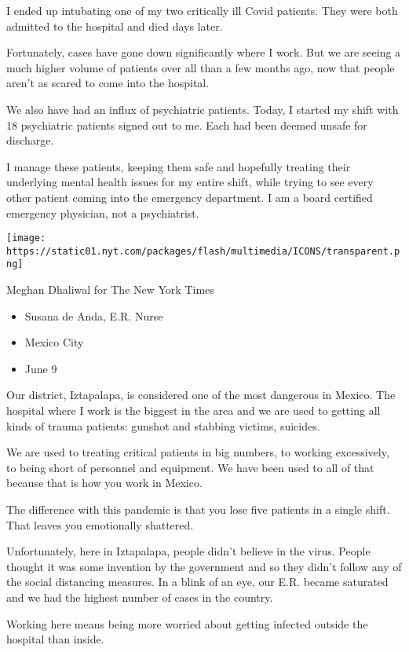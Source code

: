 I ended up intubating one of my two critically ill Covid patients. They
were both admitted to the hospital and died days later.

Fortunately, cases have gone down significantly where I work. But we are
seeing a much higher volume of patients over all than a few months ago,
now that people aren't as scared to come into the hospital.

We also have had an influx of psychiatric patients. Today, I started my
shift with 18 psychiatric patients signed out to me. Each had been
deemed unsafe for discharge.

I manage these patients, keeping them safe and hopefully treating their
underlying mental health issues for my entire shift, while trying to see
every other patient coming into the emergency department. I am a board
certified emergency physician, not a psychiatrist.

\texttt{[image: https://static01.nyt.com/packages/flash/multimedia/ICONS/transparent.png]}

Meghan Dhaliwal for The New York Times

\begin{itemize}
\tightlist
\item
  Susana de Anda, E.R. Nurse
\item
  Mexico City
\item
  June 9
\end{itemize}

Our district, Iztapalapa, is considered one of the most dangerous in
Mexico. The hospital where I work is the biggest in the area and we are
used to getting all kinds of trauma patients: gunshot and stabbing
victims, suicides.

We are used to treating critical patients in big numbers, to working
excessively, to being short of personnel and equipment. We have been
used to all of that because that is how you work in Mexico.

The difference with this pandemic is that you lose five patients in a
single shift. That leaves you emotionally shattered.

Unfortunately, here in Iztapalapa, people didn't believe in the virus.
People thought it was some invention by the government and so they
didn't follow any of the social distancing measures. In a blink of an
eye, our E.R. became saturated and we had the highest number of cases in
the country.

Working here means being more worried about getting infected outside the
hospital than inside.

